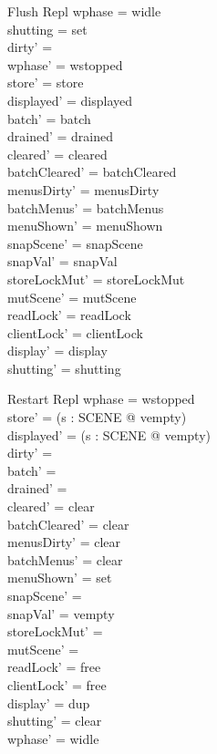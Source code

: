 \documentclass[a4paper,10pt,fleqn]{article}
\begin{document}
\begin{schema}{Flush}
  \Delta Repl
\where
  wphase = widle \\
  shutting = set \\
  dirty' = \emptyset \\
  wphase' = wstopped \\
  store' = store \\
  displayed' = displayed \\
  batch' = batch \\
  drained' = drained \\
  cleared' = cleared \\
  batchCleared' = batchCleared \\
  menusDirty' = menusDirty \\
  batchMenus' = batchMenus \\
  menuShown' = menuShown \\
  snapScene' = snapScene \\
  snapVal' = snapVal \\
  storeLockMut' = storeLockMut \\
  mutScene' = mutScene \\
  readLock' = readLock \\
  clientLock' = clientLock \\
  display' = display \\
  shutting' = shutting
\end{schema}

\begin{schema}{Restart}
  \Delta Repl
\where
  wphase = wstopped \\
  store' = (\lambda s : SCENE @ vempty) \\
  displayed' = (\lambda s : SCENE @ vempty) \\
  dirty' = \emptyset \\
  batch' = \emptyset \\
  drained' = \emptyset \\
  cleared' = clear \\
  batchCleared' = clear \\
  menusDirty' = clear \\
  batchMenus' = clear \\
  menuShown' = set \\
  snapScene' = \emptyset \\
  snapVal' = vempty \\
  storeLockMut' = \emptyset \\
  mutScene' = \emptyset \\
  readLock' = free \\
  clientLock' = free \\
  display' = dup \\
  shutting' = clear \\
  wphase' = widle
\end{schema}
\end{document}
